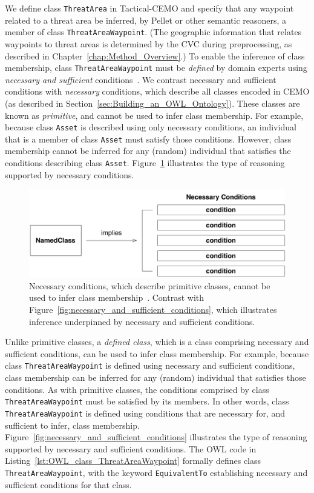We define class \texttt{ThreatArea} in Tactical-CEMO and specify that any waypoint related to a threat area be inferred, by Pellet or other semantic reasoners, a member of class \texttt{ThreatAreaWaypoint}. (The geographic information that relates waypoints to threat areas is determined by the CVC during preprocessing, as described in Chapter~\ref{chap:Method_Overview}.) To enable the inference of class membership, class \texttt{ThreatAreaWaypoint} must be \emph{defined} by domain experts using \emph{necessary and sufficient} conditions~\cite{Horridge_2011}. We contrast necessary and sufficient conditions with \emph{necessary} conditions, which describe all classes encoded in CEMO (as described in Section~\ref{sec:Building_an_OWL_Ontology}). These classes are known as \emph{primitive}, and cannot be used to infer class membership. For example, because class \texttt{Asset} is described using only necessary conditions, an individual that is a member of class \texttt{Asset} must satisfy those conditions. However, class membership cannot be inferred for any (random) individual that satisfies the conditions describing class \texttt{Asset}. Figure~\ref{fig:necessary_conditions} illustrates the type of reasoning supported by necessary conditions.

\begin{figure}[ht]
\centering
\includegraphics[scale=0.58]{img/necessary-conditions.pdf}
\caption[Primitive classes]{Necessary conditions, which describe primitive classes, cannot be used to infer class membership~\cite{Horridge_2011}. Contrast with Figure~\ref{fig:necessary_and_sufficient_conditions}, which illustrates inference underpinned by necessary and sufficient conditions.}
\label{fig:necessary_conditions}
\end{figure}

Unlike primitive classes, a \emph{defined class}, which is a class comprising necessary and sufficient conditions, can be used to infer class membership. For example, because class \texttt{ThreatAreaWaypoint} is defined using necessary and sufficient conditions, class membership can be inferred for any (random) individual that satisfies those conditions. As with primitive classes, the conditions comprised by class \texttt{ThreatAreaWaypoint} must be satisfied by its members. In other words, class \texttt{ThreatAreaWaypoint} is defined using conditions that are necessary for, and sufficient to infer, class membership. Figure~\ref{fig:necessary_and_sufficient_conditions} illustrates the type of reasoning supported by necessary and sufficient conditions. The OWL code in Listing~\ref{lst:OWL_class_ThreatAreaWaypoint} formally defines class \texttt{ThreatAreaWaypoint}, with the keyword \texttt{EquivalentTo} establishing necessary and sufficient conditions for that class.

